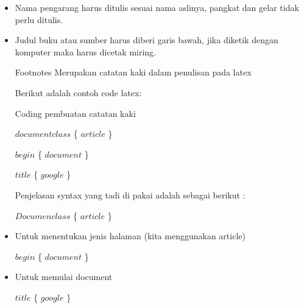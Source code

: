 \begin{itemize}
\vspace{\baselineskip}
	\item Nama pengarang harus ditulis sesuai nama aslinya, pangkat dan gelar tidak perlu ditulis.\par

\vspace{\baselineskip}
	\item Judul buku atau sumber harus diberi garis bawah, jika diketik dengan komputer maka harus dicetak miring.\par

\vspace{\baselineskip}
Footnotes Merupakan catatan kaki dalam penulisan pada latex \par

\vspace{\baselineskip}
Berikut adalah contoh code latex:\par

\vspace{\baselineskip}
Coding pembuatan catatan kaki\par

\vspace{\baselineskip}
$documentclass$ \{ $article$ \} \par

$begin$ \{ $document$ \} \par

$title$ \{ $google$ \} \par

\vspace{\baselineskip}
Penjelasan syntax yang tadi di pakai adalah sebagai berikut :\par

\vspace{\baselineskip}
$Documenclass$ \{ $article$ \} \par

\vspace{\baselineskip}
	\item Untuk menentukan jenis halaman (kita menggunakan article)\par

$begin$ \{ $document$ \} \par

\vspace{\baselineskip}
	\item Untuk memulai document\par

$title$ \{ $google$ \} \par


\end{itemize}
